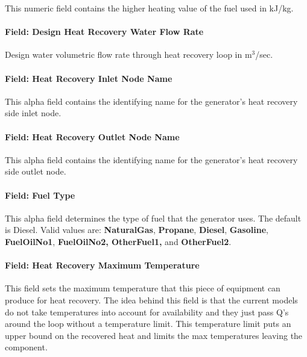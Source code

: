 This numeric field contains the higher heating value of the fuel used in kJ/kg.

\paragraph{Field: Design Heat Recovery Water Flow Rate}\label{field-design-heat-recovery-water-flow-rate}

Design water volumetric flow rate through heat recovery loop in m\(^{3}\)/sec.

\paragraph{Field: Heat Recovery Inlet Node Name}\label{field-heat-recovery-inlet-node-name}

This alpha field contains the identifying name for the generator's heat recovery side inlet node.

\paragraph{Field: Heat Recovery Outlet Node Name}\label{field-heat-recovery-outlet-node-name}

This alpha field contains the identifying name for the generator's heat recovery side outlet node.

\paragraph{Field: Fuel Type}\label{field-fuel-type}

This alpha field determines the type of fuel that the generator uses. The default is Diesel. Valid values are: \textbf{NaturalGas}, \textbf{Propane}, \textbf{Diesel}, \textbf{Gasoline}, \textbf{FuelOilNo1}, \textbf{FuelOilNo2, OtherFuel1,} and \textbf{OtherFuel2}.

\paragraph{Field: Heat Recovery Maximum Temperature}\label{field-heat-recovery-maximum-temperature}

This field sets the maximum temperature that this piece of equipment can produce for heat recovery. The idea behind this field is that the current models do not take temperatures into account for availability and they just pass Q's around the loop without a temperature limit. This temperature limit puts an upper bound on the recovered heat and limits the max temperatures leaving the component.

